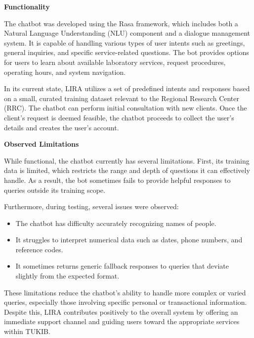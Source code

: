 \textbf{Functionality}

The chatbot was developed using the Rasa framework, which includes both a Natural Language Understanding (NLU) component and a dialogue management system. It is capable of handling various types of user intents such as greetings, general inquiries, and specific service-related questions. The bot provides options for users to learn about available laboratory services, request procedures, operating hours, and system navigation.

In its current state, LIRA utilizes a set of predefined intents and responses based on a small, curated training dataset relevant to the Regional Research Center (RRC). The chatbot can perform initial consultation with new clients. Once the client's request is deemed feasible, the chatbot proceeds to collect the user’s details and creates the user's account. 


\textbf{Observed Limitations}

While functional, the chatbot currently has several limitations. First, its training data is limited, which restricts the range and depth of questions it can effectively handle. As a result, the bot sometimes fails to provide helpful responses to queries outside its training scope.

Furthermore, during testing, several issues were observed:
\begin{itemize}
    \item The chatbot has difficulty accurately recognizing names of people.
    \item It struggles to interpret numerical data such as dates, phone numbers, and reference codes.
    \item It sometimes returns generic fallback responses to queries that deviate slightly from the expected format.
\end{itemize}

These limitations reduce the chatbot’s ability to handle more complex or varied queries, especially those involving specific personal or transactional information. Despite this, LIRA contributes positively to the overall system by offering an immediate support channel and guiding users toward the appropriate services within TUKIB.

